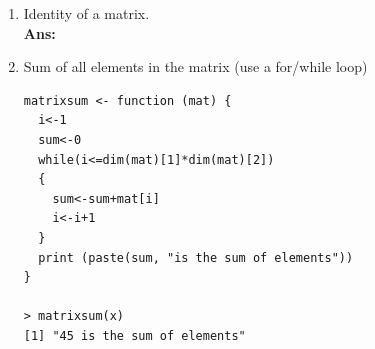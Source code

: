 \documentclass[fontsize=10pt]{scrartcl}
\begin{document}
\begin{enumerate}
\begin{enumerate}
  				\item
  				Identity of a matrix. \\
  				\textbf{Ans:} \\

  				\item
  				Sum of all elements in the matrix (use a for/while loop) \\
\begin{verbatim}
matrixsum <- function (mat) {
  i<-1
  sum<-0
  while(i<=dim(mat)[1]*dim(mat)[2])
  {
    sum<-sum+mat[i]
    i<-i+1
  }
  print (paste(sum, "is the sum of elements"))
}

> matrixsum(x)
[1] "45 is the sum of elements"
\end{verbatim}

			\end{enumerate}
		\end{enumerate}
\end{document}
